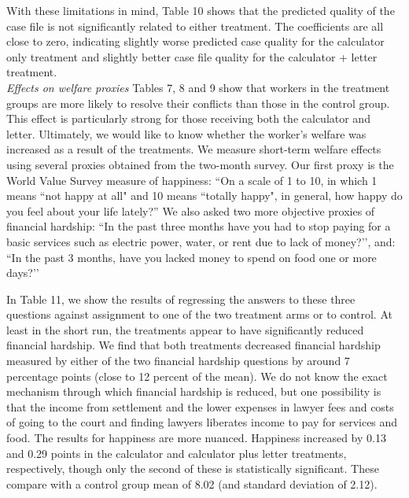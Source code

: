 \documentclass[oneside,12pt]{article}
\begin{document}
With these limitations in mind, Table 10 shows that the predicted quality of the case file is not significantly related to either treatment. The coefficients are all close to zero, indicating slightly worse predicted case quality for the calculator only treatment and slightly better case file quality for the calculator + letter treatment.
\\

\noindent\emph{Effects on welfare proxies}
Tables 7, 8 and 9 show that workers in the treatment groups are more likely to resolve their conflicts than those in the control group. This effect is particularly strong for those receiving both the calculator and letter. Ultimately, we would like to know whether the worker’s welfare was increased as a result of the treatments. We measure short-term welfare effects using several proxies obtained from the two-month survey. Our first proxy is the World Value Survey measure of happiness: “On a scale of 1 to 10, in which 1 means “not happy at all" and 10 means “totally happy", in general, how happy do you feel about your life lately?” We also asked two more objective proxies of financial hardship: “In the past three months have you had to stop paying for a basic services such as electric power, water, or rent due to lack of money?’’, and: “In the past 3 months, have you lacked money to spend on food one or more days?’’ 

In Table 11, we show the results of regressing the answers to these three questions against assignment to one of the two treatment arms or to control. At least in the short run, the treatments appear to have significantly reduced financial hardship. We find that both treatments decreased financial hardship measured by either of the two financial hardship questions by around 7 percentage points (close to 12 percent of the mean). We do not know the exact mechanism through which financial hardship is reduced, but one possibility is that the income from settlement and the lower expenses in lawyer fees and costs of going to the court and finding lawyers liberates income to pay for services and food. The results for happiness are more nuanced. Happiness increased by 0.13 and 0.29 points in the calculator and calculator plus letter treatments, respectively, though only the second of these is statistically significant. These compare with a control group mean of 8.02 (and standard deviation of 2.12). 
\end{document}
